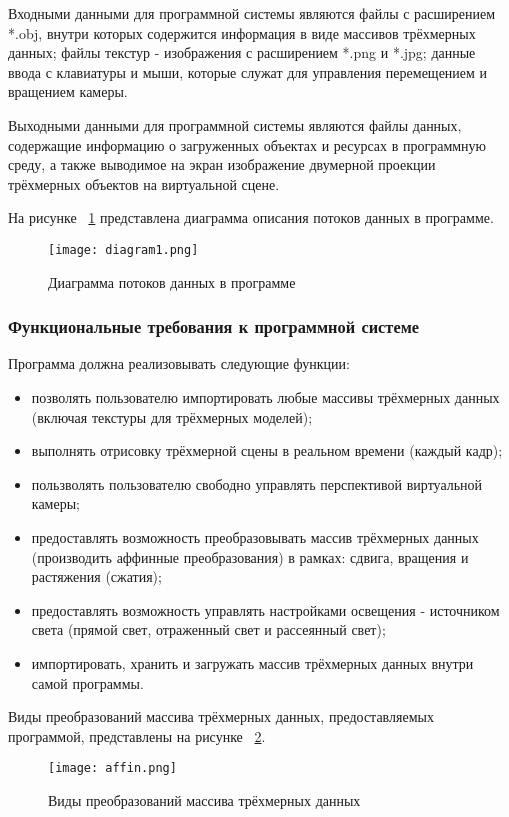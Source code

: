 Входными данными для программной системы являются файлы с расширением *.obj, внутри которых содержится информация в виде массивов трёхмерных данных; файлы текстур - изображения с расширением *.png и *.jpg; данные ввода с клавиатуры и мыши, которые служат для управления перемещением и вращением камеры.

Выходными данными для программной системы являются файлы данных, содержащие информацию о загруженных объектах и ресурсах в программную среду, а также выводимое на экран изображение двумерной проекции трёхмерных объектов на виртуальной сцене.

На рисунке ~\ref{diagram1:image} представлена диаграмма описания потоков данных в программе.

\begin{figure}[ht]
	\texttt{[image: diagram1.png]}
	\caption{Диаграмма потоков данных в программе}
	\label{diagram1:image}
\end{figure}

\subsubsection{Функциональные требования к программной системе}

Программа должна реализовывать следующие функции:
\begin{itemize}
    \item позволять пользователю импортировать любые массивы трёхмерных данных (включая текстуры для трёхмерных моделей);
    \item выполнять отрисовку трёхмерной сцены в реальном времени (каждый кадр);
    \item пользволять пользователю свободно управлять перспективой виртуальной камеры;
    \item предоставлять возможность преобразовывать массив трёхмерных данных (производить аффинные преобразования) в рамках: сдвига, вращения и растяжения (сжатия);
    \item предоставлять возможность управлять настройками освещения - источником света (прямой свет, отраженный свет и рассеянный свет);
    \item импортировать, хранить и загружать массив трёхмерных данных внутри самой программы.
\end{itemize}

Виды преобразований массива трёхмерных данных, предоставляемых программой, представлены на рисунке ~\ref{affin:image}.

\begin{figure}[ht]
\texttt{[image: affin.png]}
\caption{Виды преобразований массива трёхмерных данных}
\label{affin:image}
\end{figure}

